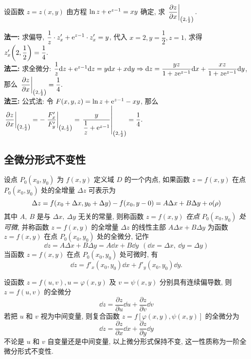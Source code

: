 \begin{example}[2018 数三]
    设函数 $z=z(x,y)$ 由方程 $\ln z+\mathrm{e} ^{z-1}=xy$ 确定, 求 $\displaystyle\eval{\pdv{z}{x}}_{\qty(2,\frac{1}{2})}.$
\end{example}
\begin{solution}
    \textbf{法一: }求偏导, $\displaystyle\dfrac{1}{z}\cdot z'_x+\mathrm{e}^{z-1}\cdot z'_x=y$, 代入 $x=2,y=\dfrac{1}{2},z=1$, 求得 $z'_x\qty(2,\dfrac{1}{2})=\dfrac{1}{4}.$\\ 
    \textbf{法二: }求全微分: $\dfrac{1}{z}\dd z+\mathrm{e} ^{z-1}\dd z=y\dd x+x\dd y\Rightarrow \dd z=\dfrac{yz}{1+z\mathrm{e} ^{z-1}}\dd x+\dfrac{xz}{1+z\mathrm{e} ^{z-1}}\dd y$, 那么 $\displaystyle\eval{\pdv{z}{x}}_{\qty(2,\frac{1}{2})}=\dfrac{1}{4}.$\\ 
    \textbf{法三: }公式法: 令 $F(x,y,z)=\ln z+\mathrm{e} ^{z-1}-xy$, 那么 $\displaystyle\eval{\pdv{z}{x}}_{\qty(2,\frac{1}{2})}=-\eval{\dfrac{F'_x}{F'_y}}_{\qty(2,\frac{1}{2})}=\eval{\dfrac{y}{\dfrac{1}{z}+\e ^{z-1}}}_{\qty(2,\frac{1}{2})}=\dfrac{1}{4}.$
\end{solution}

\subsection{全微分形式不变性}

\begin{definition}[全微分的定义]
    设点 $P_0(x_0,y_0)$ 为 $f(x,y)$ 定义域 $D$ 的一个内点, 如果函数 $z=f(x,y)$ 在点 $P_0(x_0,y_0)$ 处的全增量 $\Delta z$ 可表示为
    $$\Delta z=f(x_0+\Delta x,y_0+\Delta y)-f(x_0,y-0)=A\Delta x+B\Delta y+o\qty(\rho)$$
    其中 $A,~B$ 是与 $\Delta x,~\Delta y$ 无关的常量, 则称函数 $z=f(x,y)$ \textit{在点} $P_0(x_0,y_0)$ \textit{处可微}, 并称函数
    $z=f(x,y)$ 的全增量 $\Delta z$ 的线性主部 $A\Delta x+B\Delta y$ 为函数 $z=f(x,y)$ 在点 $P_0(x_0,y_0)$ 处的全微分, 记作
    $$\dd z=A\Delta x+B\Delta y=A\dd x+B\dd y~~(\dd x=\Delta x,~\dd y=\Delta y)$$
    当函数 $z=f(x,y)$ 在点 $P_0(x_0,y_0)$ 处可微时, 有 $$\dd z=f'_x(x_0,y_0)\dd x+f'_y(x_0,y_0)\dd y.$$
\end{definition}

\begin{theorem}[全微分的形式不变性]
    设函数 $ z=f(u, v), u=\varphi(x, y) $ 及 $ v=\psi(x, y) $ 分别具有连续偏导数, 则 $ z=f(u, v) $ 的全微分
    $$\dd  z=\frac{\partial z}{\partial u} \dd  u+\frac{\partial z}{\partial v} \dd  v$$
    若把 $ u $ 和 $ v $ 视为中间变量, 则复合函数 $ z=f[\varphi(x, y), \psi(x, y)] $ 的全微分为
    $$\dd  z=\frac{\partial z}{\partial x} \dd  x+\frac{\partial z}{\partial y} \dd  y$$
    不论是 $ u $ 和 $ v $ 自变量还是中间变量, 以上微分形式保持不变, 这一性质称为一阶全微分形式不变性.
\end{theorem}

